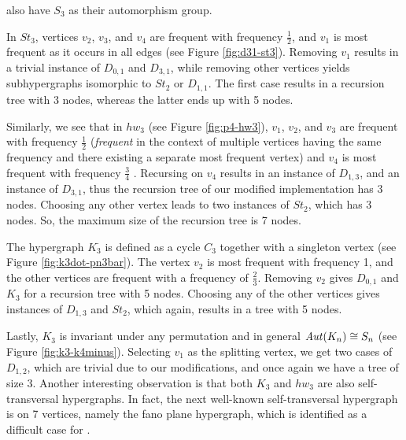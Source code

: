 also have $S_3$ as their automorphism group.

In $St_3$, vertices $v_2$, $v_3$, and $v_4$ are frequent with frequency $\frac{1}{2}$, and $v_1$ is most frequent as it occurs in all edges (see Figure \ref{fig:d31-st3}). Removing $v_1$ results in a trivial instance of $D_{0,1}$ and $D_{3,1}$, while removing other vertices yields subhypergraphs isomorphic to $St_2$ or $D_{1,1}$. The first case results in a recursion tree with 3 nodes, whereas the latter ends up with 5 nodes.

Similarly, we see that in $hw_3$ (see Figure \ref{fig:p4-hw3}), $v_1$, $v_2$, and $v_3$ are frequent with frequency $\frac{1}{2}$ (\emph{frequent} in the context of multiple vertices having the same frequency and there existing a separate most frequent vertex) and $v_4$ is most frequent with frequency $\frac{3}{4}$ . Recursing on $v_4$ results in an instance of $D_{1,3}$, and an instance of $D_{3,1}$, thus the recursion tree of our modified implementation has 3 nodes. Choosing any other vertex leads to two instances of $St_2$, which has 3 nodes. So, the maximum size of the recursion tree is 7 nodes.

The hypergraph $K_3^{\cdot}$ is defined as a cycle $C_3$ together with a singleton vertex (see Figure \ref{fig:k3dot-pn3bar}). The vertex $v_2$ is most frequent with frequency 1, and the other vertices are frequent with a frequency of $\frac{2}{3}$. Removing $v_2$ gives $D_{0,1}$ and $K_3$ for a recursion tree with 5 nodes. Choosing any of the other vertices gives instances of $D_{1,3}$ and $St_2$, which again, results in a tree with 5 nodes.

Lastly, $K_3$ is invariant under any permutation and in general $\mathit{Aut}(K_n)\cong S_n$ (see Figure \ref{fig:k3-k4minus}). Selecting $v_1$ as the splitting vertex, we get two cases of $D_{1,2}$, which are trivial due to our modifications, and once again we have a tree of size 3. Another interesting observation is that both $K_3$ and $hw_3$ are also self-transversal hypergraphs. In fact, the next well-known self-transversal hypergraph is on 7 vertices, namely the fano plane hypergraph, which is identified as a difficult case for \FKA.

